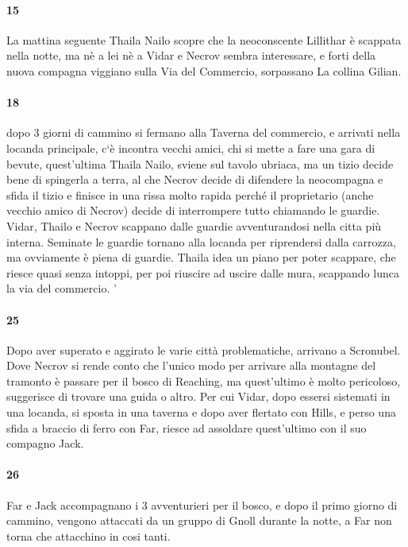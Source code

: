 \documentclass{article}
\begin{document}
      \paragraph{15} La mattina seguente Thaila Nailo scopre che la neoconscente Lillithar è scappata nella notte, ma nè a lei nè a Vidar e Necrov sembra interessare, e forti della nuova compagna viggiano sulla  Via del Commercio, sorpassano La collina Gilian.
      \paragraph{18} dopo 3 giorni di cammino si fermano alla Taverna del commercio, e arrivati nella locanda principale, c`è incontra vecchi amici, chi si mette a fare una gara di bevute, quest'ultima Thaila Nailo, sviene sul tavolo ubriaca, ma un tizio decide bene di spingerla a terra, al che Necrov decide di difendere la neocompagna e sfida il tizio e finisce in una rissa molto rapida perché il proprietario (anche vecchio amico di Necrov) decide di interrompere tutto chiamando le guardie. Vidar, Thailo e Necrov scappano dalle guardie avventurandosi nella citta più interna. Seminate le guardie tornano alla locanda per riprendersi dalla carrozza, ma ovviamente è piena di guardie. Thaila idea un piano per poter scappare, che riesce quasi senza intoppi, per poi riuscire ad uscire dalle mura, scappando lunca la via del commercio.  '
      \paragraph{25}Dopo aver superato e aggirato le varie città problematiche, arrivano a Scronubel. Dove Necrov si rende conto che l'unico modo per arrivare alla montagne del tramonto è passare per il bosco di Reaching, ma quest'ultimo è molto pericoloso, suggerisce di trovare una guida o altro. Per cui Vidar, dopo essersi sistemati in una locanda, si sposta in una taverna e dopo aver flertato con Hills, e perso una sfida a braccio di ferro con Far, riesce ad assoldare quest'ultimo con il suo compagno Jack. 
      \paragraph{26} Far e Jack accompagnano i 3 avventurieri per il bosco, e dopo il primo giorno di cammino, vengono attaccati da un gruppo di Gnoll durante la notte, a Far non torna che attacchino in cosi tanti.
\end{document}
